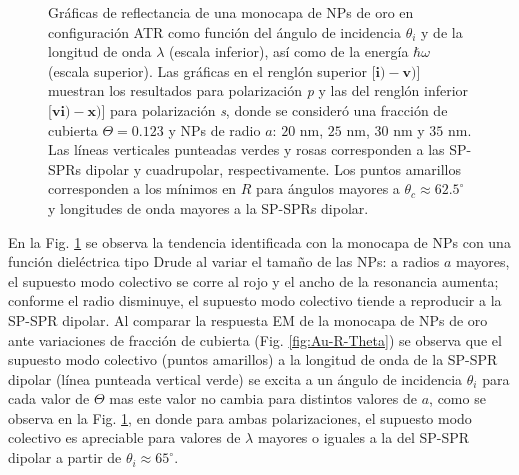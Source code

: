 \begin{figure}[t!]
\vspace*{-.5em}
	\caption{Gráficas de reflectancia de una monocapa de NPs de oro en configuración ATR como función del ángulo de incidencia $\theta_i$ y de la longitud de onda $\lambda$ (escala inferior), así como de la energía  $\hbar\omega$ (escala superior).  Las gráficas   en el renglón superior [$\mathbf{i)-v)}$] muestran los resultados para  polarización \emph{p} y las del renglón inferior  [$\mathbf{vi)-x)}$]  para polarización  \emph{s}, donde se consideró una fracción de cubierta $\Theta = 0.123$ y  NPs de radio  $a$: $20$ nm, $25$ nm, $30$ nm y $35$ nm.  Las líneas verticales punteadas verdes y rosas corresponden a las SP-SPRs dipolar y  cuadrupolar, respectivamente.  Los puntos amarillos corresponden a los mínimos en $R$ para ángulos mayores a $\theta_c\approx 62.5^\circ$ y longitudes de onda mayores a la SP-SPRs dipolar.
}	\label{fig:Au-R-Rad}	
	\end{figure}	


En la Fig. \ref{fig:Au-R-Rad} se observa la tendencia identificada con la monocapa de NPs con una función dieléctrica tipo Drude al variar el tamaño de las NPs: a radios $a$ mayores, el supuesto modo colectivo se corre al rojo y el ancho de la resonancia aumenta; conforme el radio disminuye, el supuesto modo colectivo tiende a reproducir a la SP-SPR dipolar. Al comparar la respuesta EM de la monocapa de NPs de oro ante variaciones de fracción de cubierta (Fig. \ref{fig:Au-R-Theta})  se observa que el supuesto modo colectivo (puntos amarillos) a la longitud de onda de la SP-SPR dipolar (línea punteada vertical verde) se excita a un ángulo de incidencia $\theta_i$ para cada valor de $\Theta$ mas este valor no cambia para distintos valores de $a$, como se observa en la Fig. \ref{fig:Au-R-Rad}, en donde para ambas polarizaciones, el supuesto modo colectivo es apreciable para valores de $\lambda$ mayores o iguales a la del SP-SPR dipolar a partir de $\theta_i\approx 65^\circ$.%


